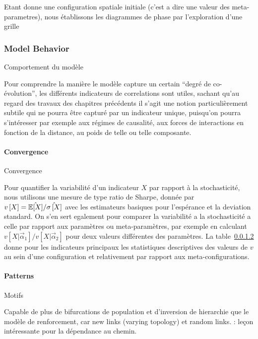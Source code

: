 Etant donne une configuration spatiale initiale (c'est a dire une valeur des meta-parametres), nous établissons les diagrammes de phase par l'exploration d'une grille


\subsubsection{Model Behavior}{Comportement du modèle}


Pour comprendre la manière le modèle capture un certain ``degré de co-évolution'', les différents indicateurs de correlations sont utiles, sachant qu'au regard des travaux des chapitres précédents il s'agit une notion particulièrement subtile qui ne pourra être capturé par un indicateur unique, puisqu'on pourra s'intéresser par exemple aux régimes de causalité, aux forces de interactions en fonction de la distance, au poids de telle ou telle composante.


\paragraph{Convergence}{Convergence}


Pour quantifier la variabilité d'un indicateur $X$ par rapport à la stochasticité, nous utilisons une mesure de type ratio de Sharpe, donnée par $v\left[X\right] = \hat{\operatorname{\mathbb{E}}\!\left[X\right]}/\hat{\sigma\left[X\right]}$ avec les estimateurs basiques pour l'espérance et la deviation standard. On s'en sert egalement pour comparer la variabilité a la stochasticité a celle par rapport aux paramètres ou meta-paramètres, par exemple en calculant $v\left[X|\vec{\alpha}_1\right]/v\left[X|\vec{\alpha}_2\right]$ pour deux valeurs différentes des paramètres. La table~\ref{} donne pour les indicateurs principaux les statistiques descriptives des valeurs de $v$ au sein d'une configuration et relativement par rapport aux meta-configurations.



\paragraph{Patterns}{Motifs}


Capable de plus de bifurcations de population et d'inversion de hierarchie que le modèle de renforcement, car new links (varying topology) et random links. : leçon intéressante pour la dépendance au chemin. 





